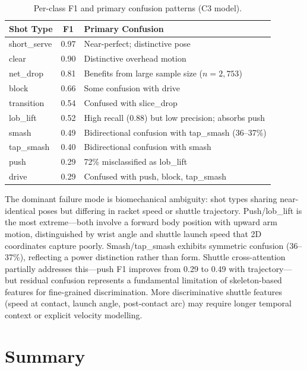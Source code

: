 \documentclass[11pt,a4paper]{article}
\begin{document}
\begin{table}[H]
\centering
\caption{Per-class F1 and primary confusion patterns (C3 model).}
\label{tab:perclass}
\begin{tabular}{@{}lcp{7.5cm}@{}}
\toprule
\textbf{Shot Type} & \textbf{F1} & \textbf{Primary Confusion} \\
\midrule
short\_serve & 0.97 & Near-perfect; distinctive pose \\
clear & 0.90 & Distinctive overhead motion \\
net\_drop & 0.81 & Benefits from large sample size ($n = 2{,}753$) \\
block & 0.66 & Some confusion with drive \\
transition & 0.54 & Confused with slice\_drop \\
lob\_lift & 0.52 & High recall (0.88) but low precision; absorbs push \\
smash & 0.49 & Bidirectional confusion with tap\_smash (36--37\%) \\
tap\_smash & 0.40 & Bidirectional confusion with smash \\
push & 0.29 & 72\% misclassified as lob\_lift \\
drive & 0.29 & Confused with push, block, tap\_smash \\
\bottomrule
\end{tabular}
\end{table}

The dominant failure mode is biomechanical ambiguity: shot types sharing near-identical poses but differing in racket speed or shuttle trajectory. Push/lob\_lift is the most extreme---both involve a forward body position with upward arm motion, distinguished by wrist angle and shuttle launch speed that 2D coordinates capture poorly. Smash/tap\_smash exhibits symmetric confusion (36--37\%), reflecting a power distinction rather than form. Shuttle cross-attention partially addresses this---push F1 improves from 0.29 to 0.49 with trajectory---but residual confusion represents a fundamental limitation of skeleton-based features for fine-grained discrimination. More discriminative shuttle features (speed at contact, launch angle, post-contact arc) may require longer temporal context or explicit velocity modelling.

\section{Summary}
\end{document}
